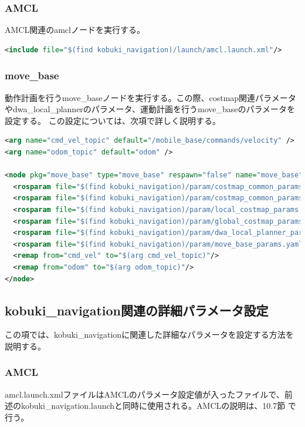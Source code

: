 \subsubsection{AMCL}
AMCL関連のamclノードを実行する。

\begin{lstlisting}[language=XML]
<include file="$(find kobuki_navigation)/launch/amcl.launch.xml"/>
\end{lstlisting}

\subsubsection{move\_base}

動作計画を行うmove\_baseノードを実行する。この際、costmap関連パラメータやdwa\_local\_plannerのパラメータ、運動計画を行うmove\_baseのパラメータを設定する。  この設定については、次項で詳しく説明する。

\begin{lstlisting}[language=XML]
<arg name="cmd_vel_topic" default="/mobile_base/commands/velocity" />
<arg name="odom_topic" default="odom" />

<node pkg="move_base" type="move_base" respawn="false" name="move_base" output="screen">
  <rosparam file="$(find kobuki_navigation)/param/costmap_common_params.yaml" command="load" ns="global_costmap" />
  <rosparam file="$(find kobuki_navigation)/param/costmap_common_params.yaml" command="load" ns="local_costmap" />
  <rosparam file="$(find kobuki_navigation)/param/local_costmap_params.yaml" command="load" />
  <rosparam file="$(find kobuki_navigation)/param/global_costmap_params.yaml" command="load" />
  <rosparam file="$(find kobuki_navigation)/param/dwa_local_planner_params.yaml" command="load" />
  <rosparam file="$(find kobuki_navigation)/param/move_base_params.yaml" command="load" />
  <remap from="cmd_vel" to="$(arg cmd_vel_topic)"/>
  <remap from="odom" to="$(arg odom_topic)"/>
</node>
\end{lstlisting}

\subsection{kobuki\_navigation関連の詳細パラメータ設定}

この項では、kobuki\_navigationに関連した詳細なパラメータを設定する方法を説明する。

\subsubsection{AMCL}
amcl.launch.xmlファイルはAMCLのパラメータ設定値が入ったファイルで、前述のkobuki\_navigation.launchと同時に使用される。AMCLの説明は、10.7節  で行う。

